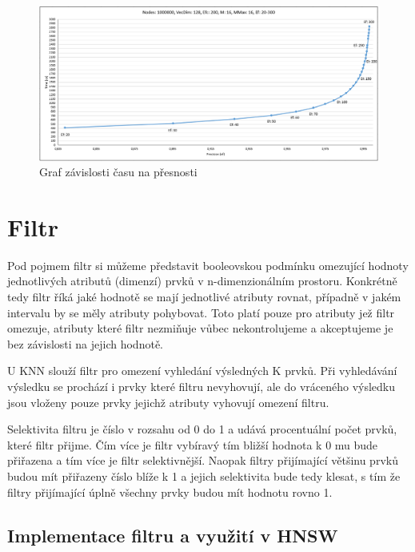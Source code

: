 \documentclass[czech,semestral,dept460,male,csharp,cpdeclaration]{diploma}
\begin{document}
		\begin{figure}
			\centering
			\includegraphics[scale=0.5]{Figures/graf_hnsw.png}
			\caption{Graf závislosti času na přesnosti}
			\label{graf_hnsw}
		\end{figure}
	
	\chapter{Filtr}
	
		Pod pojmem filtr si můžeme představit booleovskou podmínku omezující hodnoty jednotlivých atributů (dimenzí) prvků v n-dimenzionálním prostoru. Konkrétně tedy filtr říká jaké hodnotě se mají jednotlivé atributy rovnat, případně v jakém intervalu by se měly atributy pohybovat. Toto platí pouze pro atributy jež filtr omezuje, atributy které filtr nezmiňuje vůbec nekontrolujeme a akceptujeme je bez závislosti na jejich hodnotě.
		
		U KNN slouží filtr pro omezení vyhledání výsledných K prvků. Při vyhledávání výsledku se prochází i prvky které filtru nevyhovují, ale do vráceného výsledku jsou vloženy pouze prvky jejichž atributy vyhovují omezení filtru.
		
		Selektivita filtru \cite{OptINFORMIX} je číslo v rozsahu od 0 do 1 a udává procentuální počet prvků, které filtr přijme. Čím více je filtr vybíravý tím bližší hodnota k 0 mu bude přiřazena a tím více je filtr selektivnější. Naopak filtry přijímající většinu prvků budou mít přiřazeny číslo blíže k 1 a jejich selektivita bude tedy klesat, s tím že filtry přijímající úplně všechny prvky budou mít hodnotu rovno 1.
		
		\section{Implementace filtru a využití v HNSW}
		
\end{document}
